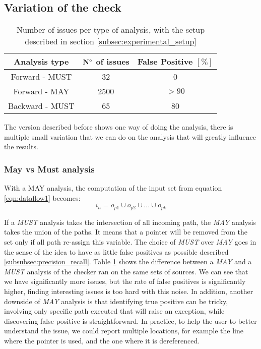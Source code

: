 \subsection{Variation of the check}
\label{subsec:rule_variation}

\begin{table}[h]
	\centering
	\caption{Number of issues per type of analysis, with the setup described in section \ref{subsec:experimental_setup}}
	\label{table:issue_per_analysis_type}
	\begin{tabular}{|c|c|c|}
		\hline
		\bf Analysis type &  \bf $\bf N^{\circ}$  of issues &  \bf False Positive $[\%]$ \\ \hline
		Forward - MUST &  32 &  0 \\ 
		Forward - MAY &  2500 & $> 90$  \\ 
		Backward - MUST &  65 & 80 \\ \hline
	\end{tabular}
\end{table}

The version described before shows one way of doing the analysis, there is multiple small variation that we can do on the analysis that will greatly influence the results.

\subsubsection{May vs Must analysis}
\label{subsubsec:may_vs_must}

With a MAY analysis, the computation of the input set from equation \ref{eqn:dataflow1} becomes:
\begin{equation}\label{eqn:mayvsmust}
i_{n} = o_{p1}  \cup   o_{p2}  \cup  ... \cup   o_{pk}
\end{equation}

If a \emph{MUST} analysis takes the intersection of all incoming path, the \emph{MAY} analysis takes the union of the paths. 
It means that a pointer will be removed from the set only if all path re-assign this variable.
The choice of \emph{MUST} over \emph{MAY} goes in the sense of the idea to have as little false positives as possible described \ref{subsubsec:precision_recall}.
Table \ref{table:issue_per_analysis_type} shows the difference between a \emph{MAY} and a \emph{MUST} analysis of the checker ran on the same sets of sources.
We can see that we have significantly more issues, but the rate of false positives is significantly higher, finding interesting issues is too hard with this noise. 
In addition, another downside of \emph{MAY} analysis is that identifying true positive can be tricky, involving only specific path executed that will raise an exception, while discovering false positive is straightforward.
In practice, to help the user to better understand the issue, we could report multiple locations, for example the line where the pointer is used, and the one where it is dereferenced.

